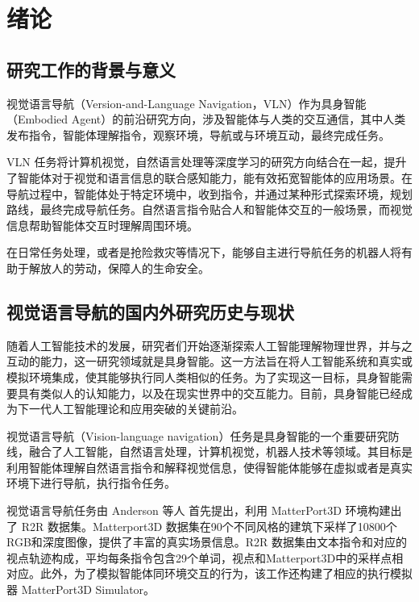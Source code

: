 \documentclass[bachelor]{thesis-uestc}
\begin{document}
\thesistableofcontents

\chapter{绪\hspace{6pt}论}

\section{研究工作的背景与意义}

视觉语言导航（Version-and-Language Navigation，VLN）作为具身智能（Embodied Agent）的前沿研究方向，涉及智能体与人类的交互通信，其中人类发布指令，智能体理解指令，观察环境，导航或与环境互动，最终完成任务。

VLN 任务将计算机视觉，自然语言处理等深度学习的研究方向结合在一起，提升了智能体对于视觉和语言信息的联合感知能力，能有效拓宽智能体的应用场景。在导航过程中，智能体处于特定环境中，收到指令，并通过某种形式探索环境，规划路线，最终完成导航任务。自然语言指令贴合人和智能体交互的一般场景，而视觉信息帮助智能体交互时理解周围环境。

在日常任务处理，或者是抢险救灾等情况下，能够自主进行导航任务的机器人将有助于解放人的劳动，保障人的生命安全。


\section{视觉语言导航的国内外研究历史与现状}
随着人工智能技术的发展，研究者们开始逐渐探索人工智能理解物理世界，并与之互动的能力，这一研究领域就是具身智能。这一方法旨在将人工智能系统和真实或模拟环境集成，使其能够执行同人类相似的任务。为了实现这一目标，具身智能需要具有类似人的认知能力，以及在现实世界中的交互能力。目前，具身智能已经成为下一代人工智能理论和应用突破的关键前沿。

视觉语言导航（Vision-language navigation）任务是具身智能的一个重要研究防线，融合了人工智能，自然语言处理，计算机视觉，机器人技术等领域。其目标是利用智能体理解自然语言指令和解释视觉信息，使得智能体能够在虚拟或者是真实环境下进行导航，执行指令任务。

视觉语言导航任务由 Anderson 等人\cite{anderson2018visionandlanguage} 首先提出，利用 MatterPort3D 环境构建出了 R2R 数据集。Matterport3D 数据集在90个不同风格的建筑下采样了10800个RGB和深度图像，提供了丰富的真实场景信息。R2R 数据集由文本指令和对应的视点轨迹构成，平均每条指令包含29个单词，视点和Matterport3D\cite{changMatterport3DLearningRGBD2017}中的采样点相对应。此外，为了模拟智能体同环境交互的行为，该工作还构建了相应的执行模拟器 MatterPort3D Simulator。
\end{document}
